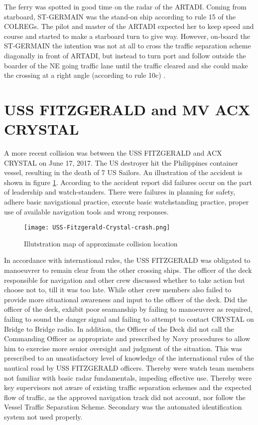 The ferry was spotted in good time on the radar of the ARTADI. Coming from  starboard, ST-GERMAIN was the stand-on ship according to rule 15 of the \ac{COLREGs}. The pilot and master of the ARTADI expected her to keep speed and course and started to make a starboard turn to give way. However, on-board the ST-GERMAIN the intention was not at all to cross the traffic separation scheme diagonally in front of ARTADI, but instead to turn port and follow outside the boarder of the NE going traffic lane until the traffic cleared and she could make the crossing at a right angle (according to rule 10c) \cite{Porathe2013}.

\newpage
\section{USS FITZGERALD and MV ACX CRYSTAL}
A more recent collision was between the USS FITZGERALD and ACX CRYSTAL on June 17, 2017. The US destroyer hit the Philippines container vessel, resulting in the death of 7 US Sailors. An illustration of the accident is shown in figure \ref{fig:Accident-USS-Fitzgerald-Crystal}. According to the accident report did failures occur on the part of leadership and watch-standers. There were failures in planning for safety, adhere basic navigational practice, execute basic watchstanding practice, proper use of available navigation tools and wrong responses.

\begin{figure}[H]
	\centering
	\texttt{[image: USS-Fitzgerald-Crystal-crash.png]}
	\caption{Illutstration map of approximate collision location}
	\label{fig:Accident-USS-Fitzgerald-Crystal}
\end{figure}

In accordance with international rules, the USS FITZGERALD was obligated to manoeuvrer to remain clear from the other crossing ships. The officer of the deck responsible for navigation and other crew discussed whether to take action but choose not to, till it was too late. While other crew members also failed to provide more situational awareness and input to the officer of the deck. Did the officer of the deck, exhibit poor seamanship by failing to manoeuvrer as required, failing to sound the danger signal and failing to attempt to contact CRYSTAL on Bridge to Bridge radio. In addition, the Officer of the Deck did not call the Commanding Officer as appropriate and prescribed by Navy procedures to allow him to exercise more senior oversight and judgment of the situation. This was prescribed to an unsatisfactory level of knowledge of the international rules of the nautical road by USS FITZGERALD officers. Thereby were watch team members not familiar with basic radar fundamentals, impeding effective use. Thereby were key supervisors not aware of existing traffic separation schemes and the expected flow of traffic, as the approved navigation track did not account, nor follow the Vessel Traffic Separation Scheme. Secondary was the automated identification system not used properly. \cite{USNavy2017}

